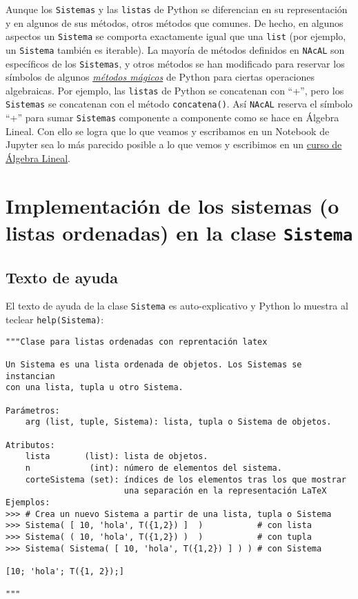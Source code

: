 \documentclass[11pt]{report}
\begin{document}
Aunque los \texttt{Sistemas} y las \texttt{listas} de Python se diferencian en su representación y en algunos de
sus métodos, otros métodos que comunes. De hecho, en algunos aspectos un \texttt{Sistema} se comporta
exactamente igual que una \texttt{list} (por ejemplo, un \texttt{Sistema} también es iterable). La mayoría de
métodos definidos en \texttt{NAcAL} son específicos de los \texttt{Sistemas}, y otros métodos se han modificado
para reservar los símbolos de algunos \href{https://docs.python.org/3/reference/datamodel.html\#specialnames}{\emph{métodos mágicos}} de Python para ciertas operaciones
algebraicas. Por ejemplo, las \texttt{listas} de Python se concatenan con ``+'', pero los \texttt{Sistemas} se
concatenan con el método \texttt{concatena()}. Así \texttt{NAcAL} reserva el símbolo ``+'' para sumar \texttt{Sistemas}
componente a componente como se hace en Álgebra Lineal. Con ello se logra que lo que veamos y
escribamos en un Notebook de Jupyter sea lo más parecido posible a lo que vemos y escribimos en un
\href{https://mbujosab.github.io/CursoDeAlgebraLineal/libro.pdf\#chapter.1}{curso de Álgebra Lineal}.

\newpage

\section{Implementación de los sistemas (o listas ordenadas) en la clase \texttt{Sistema}}
\label{sec:org26d96eb}

\subsection{Texto de ayuda}
\label{sec:org2028bc0}

El texto de ayuda de la clase \texttt{Sistema} es auto-explicativo y Python
lo muestra al teclear \texttt{help(Sistema)}:

\begin{verbatim}
"""Clase para listas ordenadas con reprentación latex

Un Sistema es una lista ordenada de objetos. Los Sistemas se instancian
con una lista, tupla u otro Sistema. 

Parámetros:
    arg (list, tuple, Sistema): lista, tupla o Sistema de objetos.

Atributos:
    lista       (list): lista de objetos.
    n            (int): número de elementos del sistema.
    corteSistema (set): índices de los elementos tras los que mostrar
                        una separación en la representación LaTeX
Ejemplos:
>>> # Crea un nuevo Sistema a partir de una lista, tupla o Sistema
>>> Sistema( [ 10, 'hola', T({1,2}) ]  )           # con lista
>>> Sistema( ( 10, 'hola', T({1,2}) )  )           # con tupla
>>> Sistema( Sistema( [ 10, 'hola', T({1,2}) ] ) ) # con Sistema

[10; 'hola'; T({1, 2});]

"""
\end{verbatim}
\end{document}
